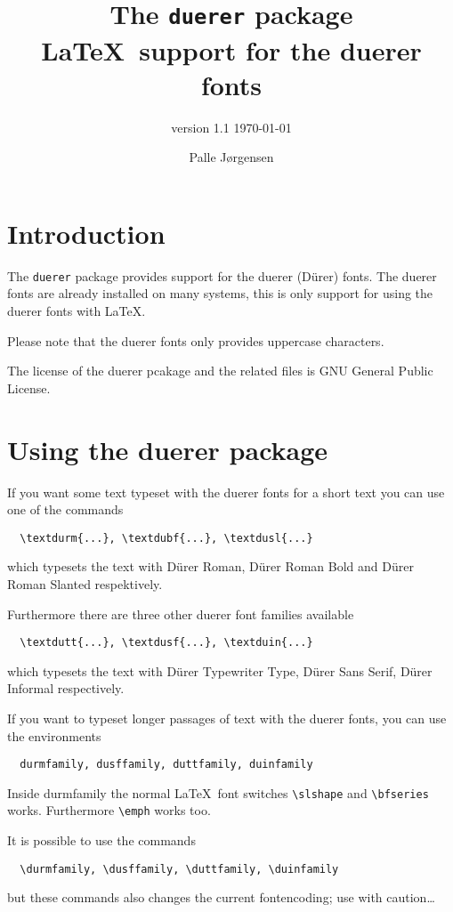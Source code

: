 \documentclass{article}
\title{The \texttt{duerer} package\medskip\\
  \large\LaTeX\ support for the duerer fonts}
\author{version 1.1 \today}
\date{Palle J\o rgensen}
\begin{document}
\maketitle

\section{Introduction}
\label{sec:introduction}

The \texttt{duerer} package provides support for the duerer (Dürer)
fonts. The duerer fonts are already installed on many systems, this is
only support for using the duerer fonts with \LaTeX.

Please note that the duerer fonts only provides uppercase characters.

The license of the duerer pcakage and the related files is GNU General
Public License.

\section{Using the duerer package}
\label{sec:using-duerer-fonts}

If you want some text typeset with the duerer fonts for a short text
you can use one of the commands

\begin{lstlisting}
  \textdurm{...}, \textdubf{...}, \textdusl{...}
\end{lstlisting}
which typesets the text with Dürer Roman, Dürer Roman Bold and Dürer
Roman Slanted respektively.

Furthermore there are three other duerer font families available
\begin{lstlisting}
  \textdutt{...}, \textdusf{...}, \textduin{...}
\end{lstlisting}
which typesets the text with Dürer Typewriter Type, Dürer Sans Serif,
Dürer Informal respectively.

If you want to typeset longer passages of text with the duerer fonts,
you can use the environments

\begin{lstlisting}
  durmfamily, dusffamily, duttfamily, duinfamily
\end{lstlisting}
Inside durmfamily the normal \LaTeX\ font switches \verb+\slshape+ and
\verb+\bfseries+ works. Furthermore \verb+\emph+ works too.

It is possible to use the commands
\begin{lstlisting}
  \durmfamily, \dusffamily, \duttfamily, \duinfamily
\end{lstlisting}
but these commands also changes the current fontencoding; use with
caution\dots \clearpage
\appendix
\end{document}
